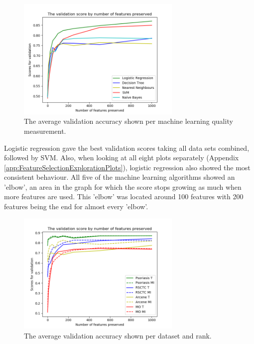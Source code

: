 \documentclass[10pt,a4paper]{report}
\begin{document}
	\begin{figure}[H]
		\includegraphics[width=0.7\textwidth]{Machine_Learning_Val_Scores.png}
		\caption{The average validation accuracy shown per machine learning quality measurement.}
		\label{fig:MachineLearningQualityScores}
	\end{figure}
	
	Logistic regression gave the best validation scores taking all data sets combined, followed by SVM. Also, when looking at all eight plots separately (Appendix \ref{app:FeatureSelectionExplorationPlots}), logistic regression also showed the most consistent behaviour. All five of the machine learning algorithms showed an 'elbow', an area in the graph for which the score stops growing as much when more features are used. This 'elbow' was located around 100 features with 200 features being the end for almost every 'elbow'.
	
	\begin{figure}[H]
		\includegraphics[width=0.7\textwidth]{Data_Rank_Val_Scores.png}
		\caption{The average validation accuracy shown per dataset and rank.}
		\label{fig:DatasetRankScores}
	\end{figure}
	
\end{document}

